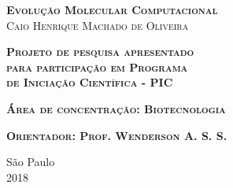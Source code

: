 \begin{center}
\textsc{\textbf{\Large Evolução Molecular Computacional }}
\\\vspace{2cm}
\textsc{\large Caio Henrique Machado de Oliveira }
\end{center}

\vspace{2cm}

\begin{flushright}
\textsc{\textbf{Projeto de pesquisa apresentado\\para participação em Programa\\de Iniciação Científica - PIC}}

\vspace{0.5cm}
\textsc{\textbf{Área de concentração: Biotecnologia}}

\vspace{0.5cm}
\textsc{\textbf{Orientador: Prof. Wenderson A. S.
S.}}
\end{flushright}

\vfill
\begin{center}
São Paulo \\ 2018
\end{center}